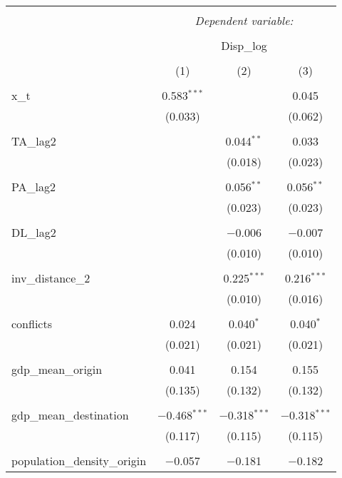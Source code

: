 
\begin{table}[!htbp] \centering 
  \caption{} 
  \label{} 
\begin{tabular}{@{\extracolsep{5pt}}lccc} 
\\[-1.8ex]\hline 
\hline \\[-1.8ex] 
 & \multicolumn{3}{c}{\textit{Dependent variable:}} \\ 
\cline{2-4} 
\\[-1.8ex] & \multicolumn{3}{c}{Disp\_log} \\ 
\\[-1.8ex] & (1) & (2) & (3)\\ 
\hline \\[-1.8ex] 
 x\_t & 0.583$^{***}$ &  & 0.045 \\ 
  & (0.033) &  & (0.062) \\ 
  & & & \\ 
 TA\_lag2 &  & 0.044$^{**}$ & 0.033 \\ 
  &  & (0.018) & (0.023) \\ 
  & & & \\ 
 PA\_lag2 &  & 0.056$^{**}$ & 0.056$^{**}$ \\ 
  &  & (0.023) & (0.023) \\ 
  & & & \\ 
 DL\_lag2 &  & $-$0.006 & $-$0.007 \\ 
  &  & (0.010) & (0.010) \\ 
  & & & \\ 
 inv\_distance\_2 &  & 0.225$^{***}$ & 0.216$^{***}$ \\ 
  &  & (0.010) & (0.016) \\ 
  & & & \\ 
 conflicts & 0.024 & 0.040$^{*}$ & 0.040$^{*}$ \\ 
  & (0.021) & (0.021) & (0.021) \\ 
  & & & \\ 
 gdp\_mean\_origin & 0.041 & 0.154 & 0.155 \\ 
  & (0.135) & (0.132) & (0.132) \\ 
  & & & \\ 
 gdp\_mean\_destination & $-$0.468$^{***}$ & $-$0.318$^{***}$ & $-$0.318$^{***}$ \\ 
  & (0.117) & (0.115) & (0.115) \\ 
  & & & \\ 
 population\_density\_origin & $-$0.057 & $-$0.181 & $-$0.182 \\ 

\end{tabular}
\end{table}
